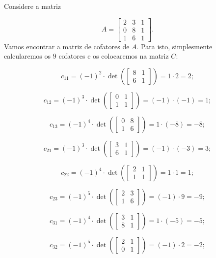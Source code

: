 \begin{Example}
	Considere a matriz
	
	$$
	A = \begin{bmatrix}
		2 & 3 & 1 \\
		0 & 8 & 1 \\
		1 & 6 & 1
	\end{bmatrix}.
	$$
	Vamos encontrar a matriz de cofatores de $A$. Para isto, simplesmente calcularemos os $9$ cofatores e os colocaremos na matriz $C$:
	
	$$
	c_{11} = (-1)^2\cdot\det\left(\begin{bmatrix}
		8 & 1 \\
		6 & 1
	\end{bmatrix}\right) = 1\cdot 2 = 2;
	$$
	
	$$
	c_{12} = (-1)^3\cdot\det\left(\begin{bmatrix}
		0 & 1 \\
		1 & 1
	\end{bmatrix}\right) = (-1)\cdot(-1) = 1;
	$$
	
	$$
	c_{13} = (-1)^4\cdot\det\left(\begin{bmatrix}
		0 & 8 \\
		1 & 6
	\end{bmatrix}\right) = 1\cdot(-8) = -8;
	$$
	
	$$
	c_{21} = (-1)^3\cdot\det\left(\begin{bmatrix}
		3 & 1 \\
		6 & 1
	\end{bmatrix}\right) = (-1)\cdot(-3) = 3;
	$$
	
	$$
	c_{22} = (-1)^4\cdot\det\left(\begin{bmatrix}
		2 & 1 \\
		1 & 1
	\end{bmatrix}\right) = 1\cdot 1 = 1;
	$$
	
	$$
	c_{23} = (-1)^5\cdot\det\left(\begin{bmatrix}
		2 & 3 \\
		1 & 6
	\end{bmatrix}\right) = (-1)\cdot 9 = -9;
	$$
	
	$$
	c_{31} = (-1)^4\cdot\det\left(\begin{bmatrix}
		3 & 1 \\
		8 & 1
	\end{bmatrix}\right) = 1\cdot (-5) = -5;
	$$
	
	$$
	c_{32} = (-1)^5\cdot\det\left(\begin{bmatrix}
		2 & 1 \\
		0 & 1
	\end{bmatrix}\right) = (-1)\cdot 2 = -2;
	$$
	

\end{Example}
